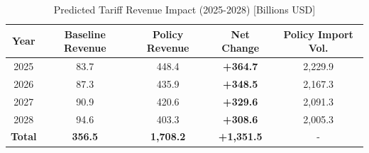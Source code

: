 \documentclass{apmcmthesis}
\begin{document}
\begin{table}[htbp]
    \centering
    \caption{Predicted Tariff Revenue Impact (2025-2028) [Billions USD]}
    \begin{tabular}{ccccc}
        \toprule
        \textbf{Year} & \textbf{Baseline Revenue} & \textbf{Policy Revenue} & \textbf{Net Change} & \textbf{Policy Import Vol.} \\
        \midrule
        2025 & 83.7 & 448.4 & \textbf{+364.7} & 2,229.9 \\
        2026 & 87.3 & 435.9 & \textbf{+348.5} & 2,167.3 \\
        2027 & 90.9 & 420.6 & \textbf{+329.6} & 2,091.3 \\
        2028 & 94.6 & 403.3 & \textbf{+308.6} & 2,005.3 \\
        \midrule
        \textbf{Total} & \textbf{356.5} & \textbf{1,708.2} & \textbf{+1,351.5} & - \\
        \bottomrule
    \end{tabular}
    \label{tab:revenue_results}
\end{table}
\end{document}
